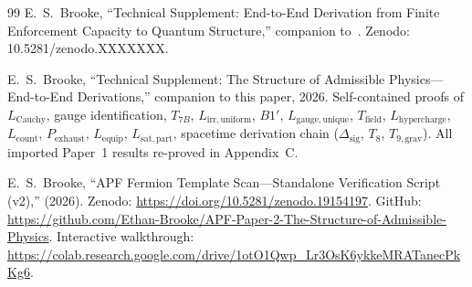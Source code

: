 \documentclass[11pt]{article}
\begin{document}
\begin{thebibliography}{99}
 E.~S.~Brooke, ``Technical Supplement: End-to-End Derivation from Finite Enforcement Capacity to Quantum Structure,'' companion to~\cite{BrookePaper1}.  Zenodo: 10.5281/zenodo.XXXXXXX.

 E.~S.~Brooke, ``Technical Supplement: The Structure of Admissible Physics---End-to-End Derivations,'' companion to this paper, 2026.  Self-contained proofs of $L_{\mathrm{Cauchy}}$, gauge identification, $T_{7B}$, $L_{\mathrm{irr,uniform}}$, $B1'$, $L_{\mathrm{gauge,unique}}$, $T_{\mathrm{field}}$, $L_{\mathrm{hypercharge}}$, $L_{\mathrm{count}}$, $P_{\mathrm{exhaust}}$, $L_{\mathrm{equip}}$, $L_{\mathrm{sat,part}}$, spacetime derivation chain ($\Delta_{\mathrm{sig}}$, $T_8$, $T_{9,\mathrm{grav}}$).  All imported Paper~1 results re-proved in Appendix~C.

 E.~S.~Brooke, ``APF Fermion Template Scan---Standalone Verification Script (v2),'' (2026).  Zenodo: \url{https://doi.org/10.5281/zenodo.19154197}.  GitHub: \url{https://github.com/Ethan-Brooke/APF-Paper-2-The-Structure-of-Admissible-Physics}.  Interactive walkthrough: \url{https://colab.research.google.com/drive/1otO1Qwp_Lr3OsK6ykkeMRATanecPkKg6}.

\end{thebibliography}
\end{document}
